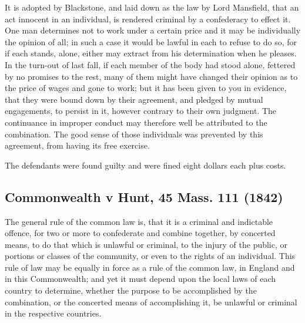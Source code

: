 \documentclass[
  letterpaper,
  11pt,
  DIV=9,
  openright]{scrbook}
\begin{document}

It is adopted by Blackstone, and laid down as the law by Lord Mansfield,
that an act innocent in an individual, is rendered criminal by a
confederacy to effect it. One man determines not to work under a certain
price and it may be individually the opinion of all; in such a case it
would be lawful in each to refuse to do so, for if each stands, alone,
either may extract from his determination when he pleases. In the
turn-out of last fall, if each member of the body had stood alone,
fettered by no promises to the rest, many of them might have changed
their opinion as to the price of wages and gone to work; but it has been
given to you in evidence, that they were bound down by their agreement,
and pledged by mutual engagements, to persist in it, however contrary to
their own judgment. The continuance in improper conduct may therefore
well be attributed to the combination. The good sense of those
individuals was prevented by this agreement, from having its free
exercise.

The defendants were found guilty and were fined eight dollars each plus
costs.

\subsection{Commonwealth v Hunt, 45 Mass. 111
(1842)}\label{commonwealth-v-hunt-45-mass.-111-1842}

The general rule of the common law is, that it is a criminal and
indictable offence, for two or more to confederate and combine together,
by concerted means, to do that which is unlawful or criminal, to the
injury of the public, or portions or classes of the community, or even
to the rights of an individual. This rule of law may be equally in force
as a rule of the common law, in England and in this Commonwealth; and
yet it must depend upon the local laws of each country to determine,
whether the purpose to be accomplished by the combination, or the
concerted means of accomplishing it, be unlawful or criminal in the
respective countries.
\end{document}
